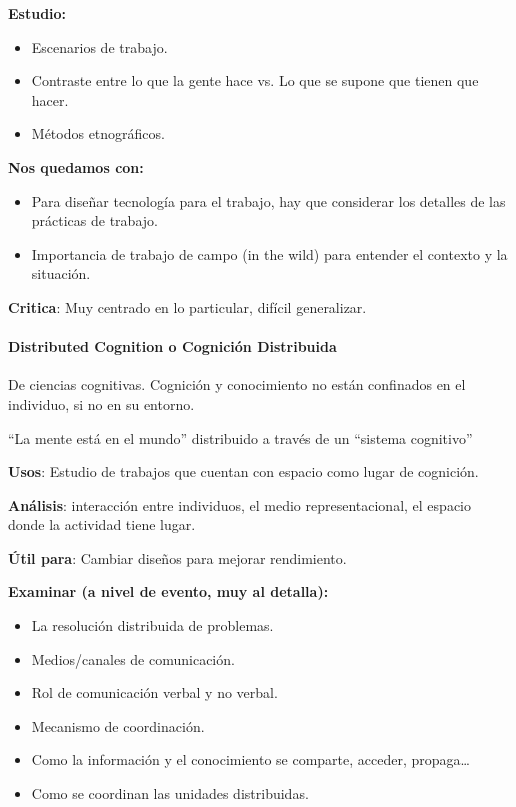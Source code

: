 \documentclass[12pt]{report} %
\begin{document}
\textbf{Estudio:}

\begin{itemize}
  \item Escenarios de trabajo.
  \item Contraste entre lo que la gente hace vs. Lo que se supone que tienen que hacer.
  \item Métodos etnográficos.
\end{itemize}

\textbf{Nos quedamos con:}
 \begin{itemize}
   \item Para diseñar tecnología para el trabajo, hay que considerar los detalles de las prácticas de trabajo.
   \item Importancia de trabajo de campo (in the wild) para entender el contexto y la situación.
 \end{itemize}


\textbf{Critica}: Muy centrado en lo particular, difícil generalizar.

\paragraph{Distributed Cognition o Cognición
Distribuida}

De ciencias cognitivas. Cognición y conocimiento no están confinados en
el individuo, si no en su entorno.

``La mente está en el mundo'' distribuido a través de un ``sistema
cognitivo''

\textbf{Usos}: Estudio de trabajos que cuentan con espacio como lugar de
cognición.

\textbf{Análisis}: interacción entre individuos, el medio
representacional, el espacio donde la actividad tiene lugar.

\textbf{Útil para}: Cambiar diseños para mejorar rendimiento.

\textbf{Examinar (a nivel de evento, muy al detalla):}

\begin{itemize}
  \item La resolución distribuida de problemas.
  \item Medios/canales de comunicación.
  \item Rol de comunicación verbal y no verbal.
  \item Mecanismo de coordinación.
  \item Como la información y el conocimiento se comparte, acceder, propaga\ldots{}
  \item Como se coordinan las unidades distribuidas.
\end{itemize}
\end{document}

